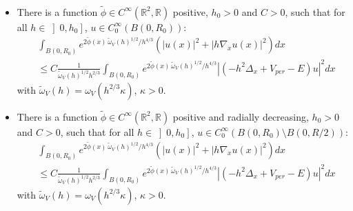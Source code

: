 \documentclass[10pt,a4paper]{amsart}
\newcommand{\nn}{\nonumber}
\begin{document}
\begin{cor}
\label{cor: cor1}
\hfill\\
\begin{itemize}
\item There is a function $\tilde{\phi} \in C^\infty(\mathbb{R}^2,\mathbb{R})$ positive, $h_0 >0 $ and $C>0$, such that for all $ h\in \left]0, h_0 \right]$, $u \in C_0^\infty(B(0,R_0))$:
\begin{align}
    &\int_{B(0,R_0)} e^{2\tilde{\phi}(x)\,\tilde{\omega}_V(h)^{1/2}/ h^{4/3}} (|u(x)|^2 +|h\nabla_x u(x)|^2)dx\nn\\
    &\leq C \frac{1}{\tilde{\omega}_V(h)^{1/2}h^{2/3}}\int_{B(0,R_0)} e^{2\tilde{\phi}(x)\,\tilde{\omega}_V(h)^{1/2}/ h^{4/3}}|(-h^2\Delta_x + V_{per}- E)u|^2dx
\end{align}
with $\tilde{\omega}_V(h)=\omega_V( h^{2/3}\kappa)$, $\kappa>0$.
 
\item There is a function $\tilde{\phi} \in C^\infty(\mathbb{R}^2,\mathbb{R})$ positive and radially decreasing, $h_0 >0 $ and $C>0$, such that for all $ h\in \left]0, h_0 \right]$, $u \in C_0^\infty(B(0,R_0)\setminus B(0,R/2))$:
\begin{align}
    &\int_{B(0,R_0)} e^{2\tilde{\phi}(x)\,\tilde{\omega}_V(h)^{1/2}/ h^{4/3}} (|u(x)|^2 +|h\nabla_x u(x)|^2)dx\nn\\
    &\leq C \frac{1}{\tilde{\omega}_V(h)^{1/2}h^{2/3}}\int_{B(0,R_0)} e^{2\tilde{\phi}(x)\,\tilde{\omega}_V(h)^{1/2}/ h^{4/3}}|(-h^2\Delta_x + V_{per}- E)u|^2dx
\end{align}
with $\tilde{\omega}_V(h)=\omega_V( h^{2/3}\kappa)$, $\kappa>0$.
\end{itemize}
\end{cor}
\end{document}

